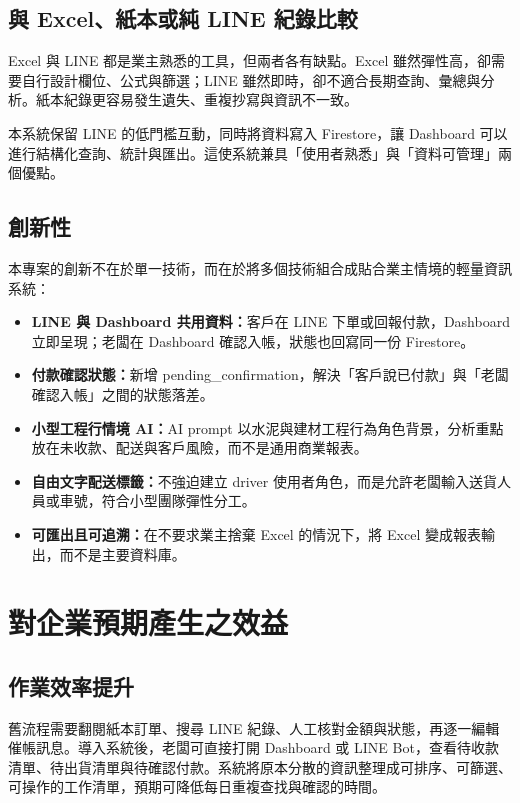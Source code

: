\documentclass[12pt,a4paper,UTF8,fontset=none]{ctexart}
\newcommand{\code}[1]{{\ttfamily\small #1}}
\begin{document}
\subsection{與 Excel、紙本或純 LINE 紀錄比較}

Excel 與 LINE 都是業主熟悉的工具，但兩者各有缺點。Excel 雖然彈性高，卻需要自行設計欄位、公式與篩選；LINE 雖然即時，卻不適合長期查詢、彙總與分析。紙本紀錄更容易發生遺失、重複抄寫與資訊不一致。

本系統保留 LINE 的低門檻互動，同時將資料寫入 Firestore，讓 Dashboard 可以進行結構化查詢、統計與匯出。這使系統兼具「使用者熟悉」與「資料可管理」兩個優點。

\subsection{創新性}

本專案的創新不在於單一技術，而在於將多個技術組合成貼合業主情境的輕量資訊系統：

\begin{itemize}
  \item \textbf{LINE 與 Dashboard 共用資料：}客戶在 LINE 下單或回報付款，Dashboard 立即呈現；老闆在 Dashboard 確認入帳，狀態也回寫同一份 Firestore。
  \item \textbf{付款確認狀態：}新增 \code{pending\_confirmation}，解決「客戶說已付款」與「老闆確認入帳」之間的狀態落差。
  \item \textbf{小型工程行情境 AI：}AI prompt 以水泥與建材工程行為角色背景，分析重點放在未收款、配送與客戶風險，而不是通用商業報表。
  \item \textbf{自由文字配送標籤：}不強迫建立 driver 使用者角色，而是允許老闆輸入送貨人員或車號，符合小型團隊彈性分工。
  \item \textbf{可匯出且可追溯：}在不要求業主捨棄 Excel 的情況下，將 Excel 變成報表輸出，而不是主要資料庫。
\end{itemize}

\section{對企業預期產生之效益}

\subsection{作業效率提升}

舊流程需要翻閱紙本訂單、搜尋 LINE 紀錄、人工核對金額與狀態，再逐一編輯催帳訊息。導入系統後，老闆可直接打開 Dashboard 或 LINE Bot，查看待收款清單、待出貨清單與待確認付款。系統將原本分散的資訊整理成可排序、可篩選、可操作的工作清單，預期可降低每日重複查找與確認的時間。
\end{document}
